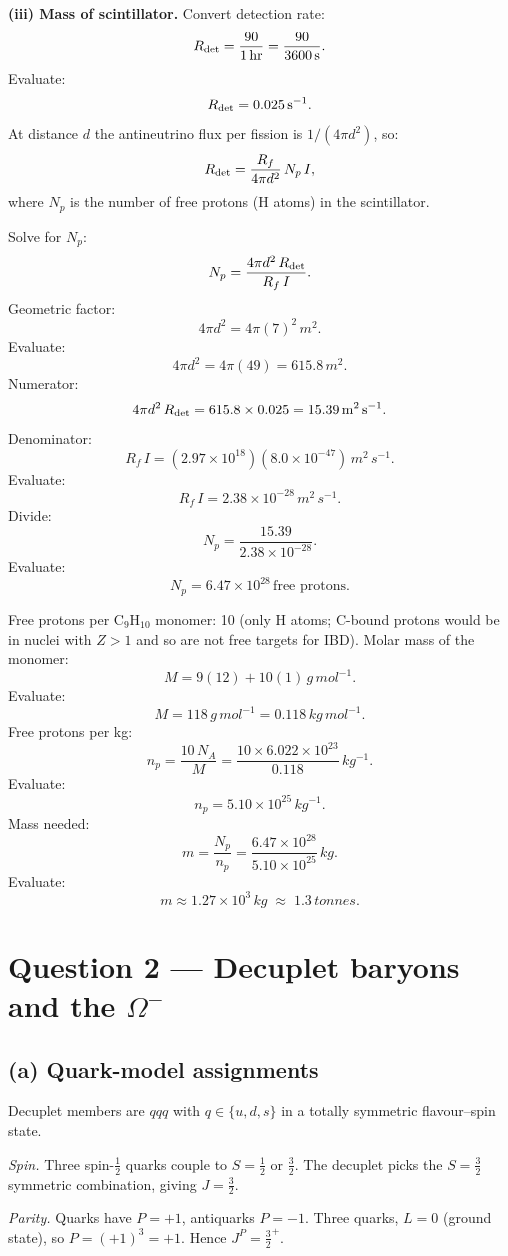 \documentclass[11pt]{article}
\begin{document}
\textbf{(iii) Mass of scintillator.} Convert detection rate:
\[ R_{\rm det} = \frac{90}{\SI{1}{hr}} = \frac{90}{3600\,\si{s}}. \]
Evaluate:
\[ R_{\rm det} = \SI{0.025}{s^{-1}}. \]
At distance $d$ the antineutrino flux per fission is $1/(4\pi d^2)$, so:
\[ R_{\rm det} = \frac{R_f}{4\pi d^2}\,N_p\,I, \]
where $N_p$ is the number of free protons (H atoms) in the scintillator.

Solve for $N_p$:
\[ N_p = \frac{4\pi d^2\,R_{\rm det}}{R_f\,I}. \]
Geometric factor:
\[ 4\pi d^2 = 4\pi (7)^2\,\si{m^2}. \]
Evaluate:
\[ 4\pi d^2 = 4\pi(49) = 615.8\,\si{m^2}. \]
Numerator:
\[ 4\pi d^2\,R_{\rm det} = 615.8\times 0.025 = 15.39\,\si{m^2\,s^{-1}}. \]
Denominator:
\[ R_f\,I = (2.97\times 10^{18})(8.0\times 10^{-47})\,\si{m^2\,s^{-1}}. \]
Evaluate:
\[ R_f\,I = 2.38\times 10^{-28}\,\si{m^2\,s^{-1}}. \]
Divide:
\[ N_p = \frac{15.39}{2.38\times 10^{-28}}. \]
Evaluate:
\[ N_p = 6.47\times 10^{28}\,\text{free protons}. \]

Free protons per C$_9$H$_{10}$ monomer: 10 (only H atoms; C-bound protons would be in nuclei with $Z>1$ and so are not free targets for IBD). Molar mass of the monomer:
\[ M = 9(12) + 10(1)\,\si{g\,mol^{-1}}. \]
Evaluate:
\[ M = 118\,\si{g\,mol^{-1}} = 0.118\,\si{kg\,mol^{-1}}. \]
Free protons per kg:
\[ n_p = \frac{10\,N_A}{M} = \frac{10\times 6.022\times 10^{23}}{0.118}\,\si{kg^{-1}}. \]
Evaluate:
\[ n_p = 5.10\times 10^{25}\,\si{kg^{-1}}. \]
Mass needed:
\[ m = \frac{N_p}{n_p} = \frac{6.47\times 10^{28}}{5.10\times 10^{25}}\,\si{kg}. \]
Evaluate:
\[ \boxed{\;m \approx 1.27\times 10^{3}\,\si{kg} \;\approx\; 1.3\,\si{tonnes}.\;} \]

\section*{Question 2 --- Decuplet baryons and the $\Omega^-$}

\subsection*{(a) Quark-model assignments}

Decuplet members are $qqq$ with $q\in\{u,d,s\}$ in a totally symmetric flavour--spin state.

\textit{Spin.} Three spin-$\tfrac12$ quarks couple to $S=\tfrac12$ or $\tfrac32$. The decuplet picks the $S=\tfrac32$ symmetric combination, giving $J=\tfrac32$.

\textit{Parity.} Quarks have $P=+1$, antiquarks $P=-1$. Three quarks, $L=0$ (ground state), so $P=(+1)^3=+1$. Hence $J^P=\tfrac32^+$.
\end{document}
